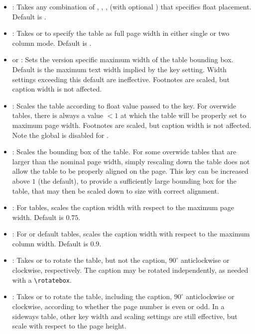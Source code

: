 \begin{itemize}
	\item {}: Takes any combination of , , ,  (with optional \invt{\!}) that specifies float placement. Default is .
	\item {}: Takes  or  to specify the table as full page width in either single or two column mode. Default is .
	\item {} or : Sets the version specific maximum width of the table bounding box. 
	Default is the maximum text width implied by the  key setting.
	Width settings exceeding this default are ineffective. Footnotes are scaled, but caption width is not affected.
	\item {}: Scales the table according to float value passed to the key. 
	For overwide tables, there is always a value $<1$ at which the table will be properly set to maximum page width.
	Footnotes are scaled, but caption width is not affected. Note the global  is disabled for .
	\item {}: Scales the bounding box of the table. 
	For some overwide tables that are larger than the nominal page width, simply rescaling down the table does not allow the table to be properly aligned on the page.
	This key can be increased above $1$ (the default), to provide a sufficiently large bounding box for the table, that may then be scaled down to size with correct alignment.
	\item {}: For  tables, scales the caption width with respect to the maximum page width. Default is $0.75$.
	\item {}: For  or default tables, scales the caption width with respect to the maximum column width. Default is $0.9$.
	\item {}: Takes  or  to rotate the table, but not the caption, $90^\circ$ anticlockwise or clockwise, respectively. 
	The caption may be rotated independently, as needed with a \lstinline{\rotatebox}.
	\item {}: Takes  or  to rotate the table, including the caption, $90^\circ$ anticlockwise or clockwise, 
	according to whether the page number is even or odd.
	In a sideways table, other key width and scaling settings are still effective, but scale with respect to the page height. 
\end{itemize}


